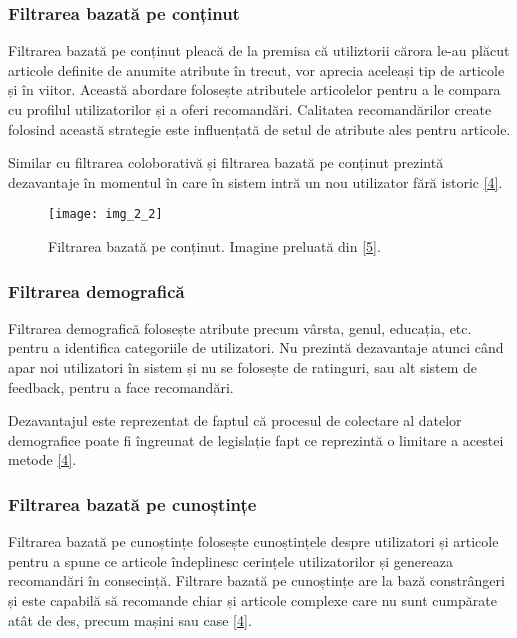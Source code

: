 \subsubsection*{Filtrarea bazată pe conținut}

Filtrarea bazată pe conținut pleacă de la premisa că utiliztorii cărora le-au plăcut articole definite de anumite atribute în trecut, vor aprecia aceleași tip de articole și în viitor. Această abordare folosește atributele articolelor pentru a le compara cu profilul utilizatorilor și a oferi recomandări. Calitatea recomandărilor create folosind această strategie este influențată de setul de atribute ales pentru articole.

Similar cu filtrarea coloborativă și filtrarea bazată pe conținut prezintă dezavantaje în momentul în care în sistem intră un nou utilizator fără istoric \hyperlink{ErionCanoMaurizioMorisio}{[4]}.

\begin{figure}[!h]
	\centering
	\texttt{[image: img\_2\_2]}
	\caption[Filtrarea bazată pe conținut]{Filtrarea bazată pe conținut. Imagine preluată din \hyperlink{datameetsmedia}{[5]}.}
\end{figure} 

\subsubsection*{Filtrarea demografică}

Filtrarea demografică folosește atribute precum vârsta, genul, educația, etc. pentru a identifica categoriile de utilizatori. Nu prezintă dezavantaje atunci când apar noi utilizatori în sistem și nu se folosește de ratinguri, sau alt sistem de feedback, pentru a face recomandări.

Dezavantajul este reprezentat de faptul că procesul de colectare al datelor demografice poate fi îngreunat de legislație fapt ce reprezintă o limitare a acestei metode \hyperlink{ErionCanoMaurizioMorisio}{[4]}.

\subsubsection*{Filtrarea bazată pe cunoștințe}

Filtrarea bazată pe cunoștințe folosește cunoștințele despre utilizatori și articole pentru a spune ce articole îndeplinesc cerințele utilizatorilor și genereaza recomandări în consecință. Filtrare bazată pe cunoștințe are la bază constrângeri și este capabilă să recomande chiar și articole complexe care nu sunt cumpărate atât de des, precum mașini sau case \hyperlink{ErionCanoMaurizioMorisio}{[4]}.

